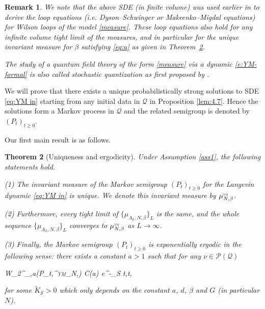 \documentclass[11pt,UTF-8,reqno]{amsart}
\numberwithin{equation}{section}
\newtheorem{theorem}{Theorem}[section]
\newtheorem{remark}[theorem]{Remark}
\def\dif{{\mathord{{\rm d}}}}
\def\cQ{{\mathcal Q}}
\def\cS{{\mathcal S}}
\def\sP{{\mathscr P}}
\def\geq{\geqslant}
\def\leq{\leqslant}
\def\dif{{\mathord{{\rm d}}}}
\def\bt{\begin{theorem}}
\def\et{\end{theorem}}
\def\br{\begin{remark}}
\def\er{\end{remark}}
\def\geq{\geqslant}
\def\leq{\leqslant}
\def\YM{\textnormal{\tiny \textsc{ym}}}
\def\muYM{\mu^{\YM}_{N,\beta}}
\begin{document}
\br
We note that the above SDE (in finite volume) was  used earlier in \cite{SSZloop} to derive the
loop equations (i.e. Dyson--Schwinger or Makeenko--Migdal equations) for Wilson loops of the model \eqref{measure}. These loop equations also hold for any infinite volume tight limit of the measures, and in particular for the unique invariant measure for $\beta$ satisfying \eqref{eq:a} as given in Theorem~\ref{th:1.3}.


The study of a quantum field theory of the form \eqref{measure} via a dynamic \eqref{e:YM-formal} 
 is also called stochastic quantization as first proposed by 
\cite{Nelson66,ParisiWu}.
\er



 We will prove that there exists a unique probabilistically strong solutions  to SDE \eqref{eq:YM in} starting from any initial data in $ \cQ$ in  Proposition \ref{lem:4.7}. Hence the solutions form a Markov process in $\cQ$ and the related semigroup is denoted by $(P_t)_{t\geq0}$.


Our first main result is as follows. %



\bt[Uniqueness and ergodicity]
\label{th:1.3}
Under Assumption \ref{ass1}, the following statements hold.

(1) The invariant measure of the Markov semigroup $(P_t)_{t\geq0}$ for the Langevin dynamic %
\eqref{eq:YM in}
 is unique. We denote this invariant measure by $\muYM$.

(2) Furthermore, every tight limit of $\{\mu_{\Lambda_L,N,\beta}\}_L$ is the same,
 and the whole sequence  $\{\mu_{\Lambda_L,N,\beta}\}_L$ converges to $\muYM$ as $L\to \infty$.

(3) Finally, the Markov semigroup $(P_t)_{t\geq0}$ is exponentially ergodic in the following sense: %
 there exists a constant $a>1$ such that
for any $\nu\in \sP(\cQ)$
\begin{equ}[e:WnuP]
	W_2^{\rho_{\infty,a}}(\nu P_t,\muYM)
	\leq C(a) e^{-_{\cS} t},\quad t\geq0,
\end{equ}
for some $\widetilde{K}_{\cS}>0$  which only depends on the constant $a$,  $d$, $\beta$ and $G$ (in particular $N$).
\et
\end{document}
